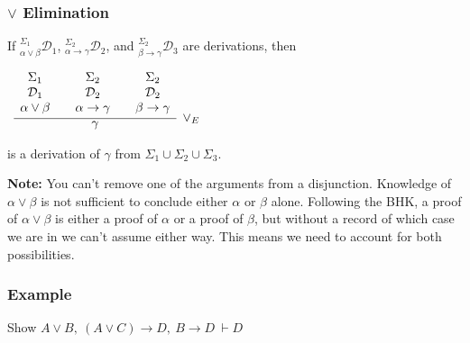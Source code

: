 \documentclass{beamer}
\begin{document}
\begin{frame}
	\frametitle{$\lor$ Elimination}
	
	If $^{\Sigma_{1}}_{\alpha\lor\beta}\mathcal{D}_{1}$, $^{\Sigma_{2}}_{\alpha\rightarrow\gamma}\mathcal{D}_{2}$, and $^{\Sigma_{2}}_{\beta\rightarrow\gamma}\mathcal{D}_{3}$ are derivations, then
	
	\begin{center}
	$\begin{array}{ c }
	
		\infer[\lor_{E}]{\gamma}
			{
			\begin{array}{c} \Sigma_{1}  \\ \mathcal{D}_{1} \\ \alpha\lor\beta \end{array}
			 & 
			\begin{array}{c} \Sigma_{2}  \\ \mathcal{D}_{2} \\ \alpha\rightarrow\gamma \end{array}				
			 & 
			\begin{array}{c} \Sigma_{2}  \\ \mathcal{D}_{2} \\ \beta\rightarrow\gamma \end{array}				 
			}	
	
	\end{array}$
	\end{center}
	
	is a derivation of $\gamma$ from $\Sigma_{1}\cup\Sigma_{2}\cup\Sigma_{3}$.
	
	\vspace{0.5cm}
	
	{\bf Note:} You can't remove one of the arguments from a disjunction. Knowledge of $\alpha \lor \beta$ is not sufficient to conclude either $\alpha$ or $\beta$ alone. Following the BHK, a proof of $\alpha \lor \beta$ is either a proof of $\alpha$ or a proof of $\beta$, but without a record of which case we are in we can't assume either way. This means we need to account for both possibilities. 
	
\end{frame}



\begin{frame}
  \frametitle{Example}

	Show $A \lor B, \ (A \lor C)\rightarrow D, \ B \rightarrow D  \ \vdash D$
	
	\vspace{7cm}



\end{frame}
\end{document}
